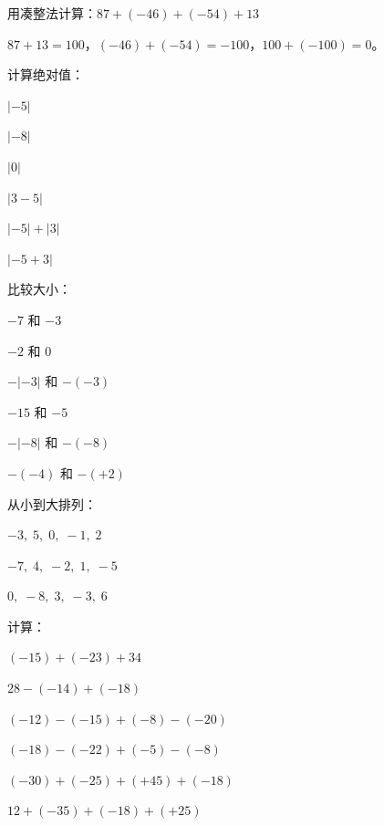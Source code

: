 \begin{example}
用凑整法计算：$87+(-46)+(-54)+13$
\end{example}
\begin{solution}
$87+13=100$，$(-46)+(-54)=-100$，$100+(-100)=0$。
\end{solution}

\begin{exercise}
\item 计算绝对值：
  \begin{subexercise}
    \item $|-5|$
    \item $|-8|$
    \item $|0|$
    \item $|3-5|$
    \item $|-5|+|3|$
    \item $|-5+3|$
  \end{subexercise}

\item 比较大小：
  \begin{subexercise}
    \item $-7$ 和 $-3$
    \item $-2$ 和 $0$
    \item $-|{-3}|$ 和 $-(-3)$
    \item $-15$ 和 $-5$
    \item $-|{-8}|$ 和 $-(-8)$
    \item $-(-4)$ 和 $-(+2)$
  \end{subexercise}

\item 从小到大排列：
  \begin{subexercise}
    \item $-3,\;5,\;0,\;-1,\;2$
    \item $-7,\;4,\;-2,\;1,\;-5$
    \item $0,\;-8,\;3,\;-3,\;6$
  \end{subexercise}

\item 计算：
  \begin{subexercise}
    \item $(-15)+(-23)+34$
    \item $28-(-14)+(-18)$
    \item $(-12)-(-15)+(-8)-(-20)$
    \item $(-18)-(-22)+(-5)-(-8)$
    \item $(-30)+(-25)+(+45)+(-18)$
    \item $12+(-35)+(-18)+(+25)$
  \end{subexercise}


\end{exercise}
